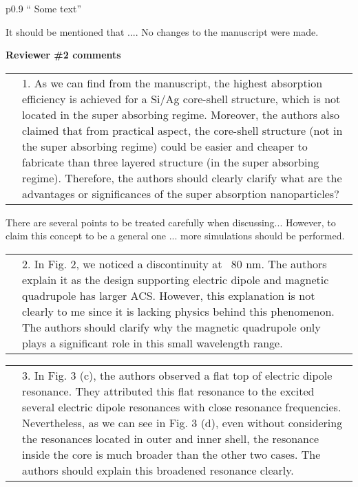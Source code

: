 \documentclass[a4paper]{article}
\begin{document}
\begin{tabular}[!H]{p{0.9\textwidth}}
`` Some text''
\end{tabular}

It should be mentioned that .... No changes to the
manuscript were made.

\vspace{10pt}

\begin{minipage}{1.0\linewidth}
  \textbf{Reviewer \#2 comments}\\
  \begin{tabular}[!H]{l|p{}}
    \quad & 1.  As we can find from the manuscript, the highest
    absorption efficiency is achieved for a Si/Ag core-shell
    structure, which is not located in the super absorbing
    regime. Moreover, the authors also claimed that from practical
    aspect, the core-shell structure (not in the super absorbing
    regime) could be easier and cheaper to fabricate than three
    layered structure (in the super absorbing regime). Therefore, the
    authors should clearly clarify what are the advantages or
    significances of the super absorption nanoparticles? 
\end{tabular}
\end{minipage}

There are several points to be treated carefully when discussing...
 However, to claim this concept to be a general one ...  more simulations
should be performed.

\begin{tabular}[!H]{l|p{}}
  \quad &  2.      In Fig. 2, we noticed a discontinuity at ~80
  nm. The authors explain it as the design supporting electric dipole
  and magnetic quadrupole has larger ACS. However, this explanation is
  not clearly to me since it is lacking physics behind this
  phenomenon. The authors should clarify why the magnetic quadrupole
  only plays a significant role in this small wavelength range. 
\end{tabular}


\begin{tabular}[!H]{l|p{}}
\quad & 3.      In Fig. 3 (c), the authors observed a flat top of
electric dipole resonance. They attributed this flat resonance to the
excited several electric dipole resonances with close resonance
frequencies. Nevertheless, as we can see in Fig. 3 (d), even without
considering the resonances located in outer and inner shell, the
resonance inside the core is much broader than the other two
cases. The authors should explain this broadened resonance clearly. 
\end{tabular}
\end{document}
